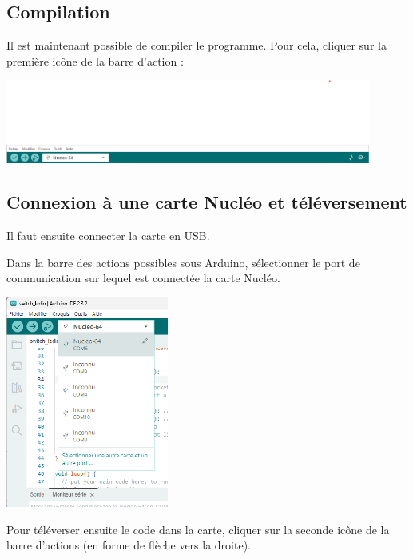 \documentclass[a4paper,11pt,titlepage]{article} %
\begin{document}
\subsection{Compilation}

Il est maintenant possible de compiler le programme. Pour cela, cliquer sur la première icône de la barre d'action :

\begin{center}
	\includegraphics[width=0.9\textwidth]{images/arduino_compile_run.png}
\end{center}

\bigskip


\subsection{Connexion à une carte Nucléo et téléversement}

Il faut ensuite connecter la carte en USB.

Dans la barre des actions possibles sous Arduino, sélectionner le port de communication sur lequel est connectée la carte Nucléo.

\begin{center}
	\includegraphics[width=0.4\textwidth]{images/arduino_cartes_nucleo_comXX.png}
\end{center}

Pour téléverser ensuite le code dans la carte, cliquer sur la seconde icône de la barre d'actions (en forme de flèche vers la droite).
\end{document}
